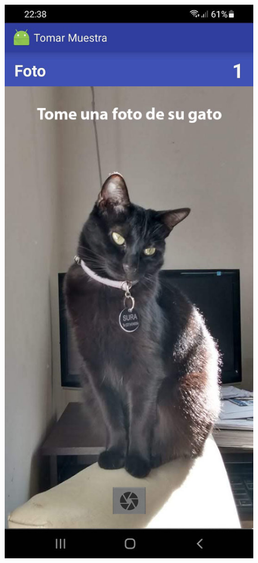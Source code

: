\begin{figure}[H]
  \centering
   \includegraphics[scale=0.23]{50-anexos/C-steps/photo_screen1.jpg} 

\end{figure}
